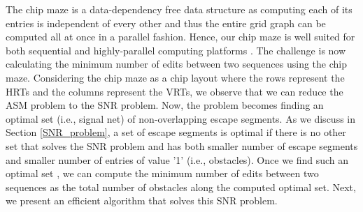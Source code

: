 The chip maze is a data-dependency free data structure as computing each of its entries is independent of every other and thus the entire grid graph can be computed all at once in a parallel fashion. Hence, our chip maze is well suited for both sequential and highly-parallel computing platforms \citep{seshadri2017ambit}.
The challenge is now calculating the minimum number of edits between two sequences using the chip maze. 
Considering the chip maze as a chip layout where the rows represent the HRTs and the columns represent the VRTs, we observe that we can reduce the ASM problem to the SNR problem. 
Now, the problem becomes finding an optimal set (i.e., signal net) of non-overlapping escape segments. As we discuss in Section \ref{SNR_problem}, a set of escape segments is optimal if there is no other set that solves the SNR problem and has both {smaller} number of escape segments and {smaller} number of entries of value '1' (i.e., obstacles). Once we find such an optimal set , we can compute the minimum number of edits between two sequences as the total number of obstacles along the computed optimal set. 
Next, we present an efficient algorithm that solves this SNR problem.






